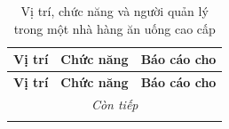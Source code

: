 \begin{longtable}{| p{4cm} | p{8cm} | p{3cm} |}
	\caption{Vị trí, chức năng và người quản lý trong một nhà hàng ăn uống cao cấp}                                                                                                                                                                               \\
	\hline
	\textbf{Vị trí}                                                                   & \textbf{Chức năng}                                                                                                                              & \textbf{Báo cáo cho}    \\
	\hline
	\endfirsthead

	\hline
	\textbf{Vị trí}                                                                   & \textbf{Chức năng}                                                                                                                              & \textbf{Báo cáo cho}    \\
	\hline
	\endhead

	\hline
	\multicolumn{3}{|c|}{\textit{Còn tiếp}}                                                                                                                                                                                                                       \\
	\hline
	\endfoot

	\hline
	\endlastfoot


\end{longtable}
